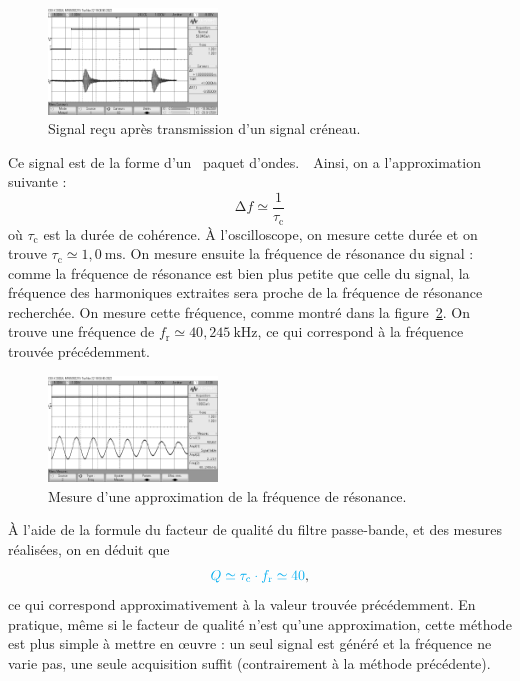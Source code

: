 \documentclass[a4paper,twocolumn,10pt]{report}
\begin{document}
	\begin{figure}[H]
		\centering
		\includegraphics[width=0.4\textwidth]{figures/scope_2.png}
		\caption{Signal reçu après transmission d'un signal créneau.}
		\label{fig:cre-passe-bande}
	\end{figure}

	Ce signal est de la forme d'un \guillemotleft~paquet d'ondes.~\guillemotright\ Ainsi, on a l'approximation suivante : \[
		\mathrm{\Delta}f \simeq \frac{1}{\tau_\mathrm{c}}
	\] où $\tau_\mathrm{c}$\/ est la durée de cohérence.
	À l'oscilloscope, on mesure cette durée et on trouve $\tau_\mathrm{c} \simeq 1{,}0\: \mathrm{ms}$.
	On mesure ensuite la fréquence de résonance du signal : comme la fréquence de résonance est bien plus petite que celle du signal, la fréquence des harmoniques extraites sera proche de la fréquence de résonance recherchée. On mesure cette fréquence, comme montré dans la figure~\ref{fig:cre-passe-bande-zoom}. On trouve une fréquence de $f_\mathrm{r} \simeq 40{,}245\:\mathrm{kHz}$, ce qui correspond à la fréquence trouvée précédemment.

	\begin{figure}[H]
		\centering
		\includegraphics[width=0.4\textwidth]{figures/scope_1.png}
		\caption{Mesure d'une approximation de la fréquence de résonance.}
		\label{fig:cre-passe-bande-zoom}
	\end{figure}

	À l'aide de la formule du facteur de qualité du filtre passe-bande, et des mesures réalisées, on en déduit que \[
		{\color{cyan}Q \simeq \tau_\mathrm{c} \cdot f_{\mathrm{r}} \simeq 40},
	\] ce qui correspond approximativement à la valeur trouvée précédemment.
	En pratique, même si le facteur de qualité n'est qu'une approximation, cette méthode est plus simple à mettre en œuvre : un seul signal est généré et la fréquence ne varie pas, une seule acquisition suffit (contrairement à la méthode précédente).
\end{document}

